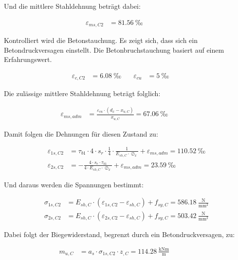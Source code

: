 \documentclass[
  11pt,
  letterpaper,
]{scrreprt}
\begin{document}
Und die mittlere Stahldehnung beträgt dabei:

\[
\begin{aligned}
\varepsilon_{m s , C2}& = 81.56 \ \mathrm{‰} \quad &  \quad &  
 \end{aligned}
\]

Kontrolliert wird die Betonstauchung. Es zeigt sich, dass sich ein
Betondruckversagen einstellt. Die Betonbruchstauchung basiert auf einem
Erfahrungswert.

\[
\begin{aligned}
\varepsilon_{c , C2}& = 6.08 \ \mathrm{‰} \quad & \varepsilon_{cu}& = 5 \ \mathrm{‰} \quad &  
 \end{aligned}
\]

Die zulässige mittlere Stahldehnung beträgt folglich:

\[
\begin{aligned}
\varepsilon_{m s , adm}& = \frac{\varepsilon_{cu} \cdot \left(d_{x} - x_{u , C}\right)}{x_{u , C}} = 67.06 \ \mathrm{‰} \quad &  \quad &  
 \end{aligned}
\]

Damit folgen die Dehnungen für diesen Zustand zu:

\[
\begin{aligned}
\varepsilon_{1 s , C2}& = \tau_{b1} \cdot 4 \cdot s_{r} \cdot \frac{1}{4} \cdot \frac{1}{E_{sh , C} \cdot \oslash_{x}} + \varepsilon_{m s , adm} = 110.52 \ \mathrm{‰} \\ 
\varepsilon_{2 s , C2}& = - \frac{4 \cdot s_{r} \cdot \tau_{b1}}{4 \cdot E_{sh , C} \cdot \oslash_{x}} + \varepsilon_{m s , adm} = 23.59 \ \mathrm{‰} \end{aligned}
\]

Und daraus werden die Spannungen bestimmt:

\[
\begin{aligned}
\sigma_{1 s , C2}& = E_{sh , C} \cdot \left(\varepsilon_{1 s , C2} - \varepsilon_{sh , C}\right) + f_{sy , C} = 586.18 \ \frac{\mathrm{N}}{\mathrm{mm}^{2}} \\ 
\sigma_{2 s , C2}& = E_{sh , C} \cdot \left(\varepsilon_{2 s , C2} - \varepsilon_{sh , C}\right) + f_{sy , C} = 503.42 \ \frac{\mathrm{N}}{\mathrm{mm}^{2}} \end{aligned}
\]

Dabei folgt der Biegewiderstand, begrenzt durch ein Betondruckversagen,
zu:

\[
\begin{aligned}
m_{u , C}& = a_{s} \cdot \sigma_{1 s , C2} \cdot z_{, C} = 114.28 \ \frac{\mathrm{kNm}}{\mathrm{m}} \quad &  \quad &  
 \end{aligned}
\]
\end{document}
